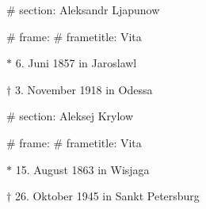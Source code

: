 
# section: Aleksandr Ljapunow

# frame:
  # frametitle: Vita

  $*$ 6. Juni 1857 in Jaroslawl

  $\dagger$ 3. November 1918 in Odessa



# section: Aleksej Krylow

# frame:
  # frametitle: Vita

  $*$ 15. August 1863 in Wisjaga

  $\dagger$ 26. Oktober 1945 in Sankt Petersburg
